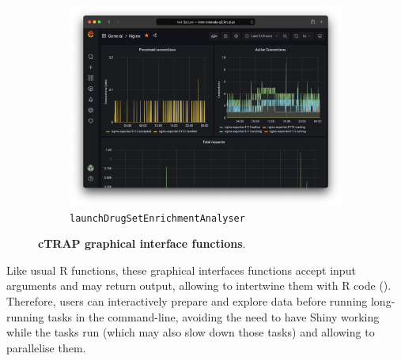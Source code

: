 \begin{figure}[!h]
\begin{subfigure}[h]{0.45\textwidth}
		\includegraphics[width=\textwidth]{images/app-server/grafana-nginx}
		\caption{\footnotesize{\texttt{launchDrugSetEnrichmentAnalyser}}}
	\end{subfigure}
	\caption[cTRAP graphical interface functions]{\textbf{cTRAP graphical interface functions}.}
	\label{fig:ctrap-ui-functions}
\end{figure}

Like usual R functions, these graphical interfaces functions accept input arguments and may return output, allowing to intertwine them with R code (). Therefore, users can interactively prepare and explore data before running long-running tasks in the command-line, avoiding the need to have Shiny working while the tasks run (which may also slow down those tasks) and allowing to parallelise them.

